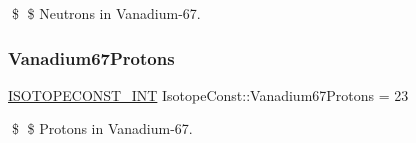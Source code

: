 \$ \$ Neutrons in Vanadium-\/67. \mbox{\label{group___isotope_const-_vanadium-_v67_gafb8f7d70e5e0b6d4803acf0a909d7c81}} 
\subsubsection{\texorpdfstring{Vanadium67\+Protons}{Vanadium67Protons}}
{\footnotesize\ttfamily \mbox{\hyperlink{group___isotope_const-_macros_ga5f18360b3e99483a35c32d789e62621c}{I\+S\+O\+T\+O\+P\+E\+C\+O\+N\+S\+T\+\_\+\+I\+NT}} Isotope\+Const\+::\+Vanadium67\+Protons = 23}

\$ \$ Protons in Vanadium-\/67. 